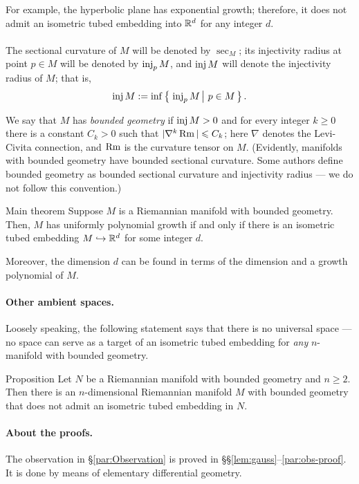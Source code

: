 \documentclass[a4paper,10pt]{article}
\begin{document}
For example,
the hyperbolic plane has exponential growth;
therefore, it does not admit an isometric tubed embedding into $\mathbb{R}^d$ for any integer $d$.




\paragraph{}\label{par:main} 
The sectional curvature of $M$ will be denoted by $\sec_M$;
its injectivity radius at point $p\in M$ will be denoted by $\operatorname{\rm inj}_pM$, and $\operatorname{\rm inj} M$ will denote the injectivity radius of $M$; that is, 
\[\inj M\df \inf\set{\inj_pM}{p\in M}.\]

We say that $M$ has \emph{bounded geometry} if $\operatorname{\rm inj} M>0$ and for every integer $k\ge 0$ there is a constant $C_k > 0$ such that $|\nabla^k \operatorname{\rm Rm}| \leqslant C_k$;
here $\nabla$ denotes the Levi-Civita connection, and $\operatorname{\rm Rm}$ is the curvature tensor on $M$.
(Evidently, manifolds with bounded geometry have bounded sectional curvature.
Some authors define bounded geometry as bounded sectional curvature and injectivity radius --- we do not follow this convention.)

\begin{thm}{Main theorem}
Suppose $M$ is a Riemannian manifold with bounded geometry.
Then, $M$ has uniformly  polynomial growth
if and only if there is an isometric tubed embedding $M \hookrightarrow \mathbb{R}^d$ for some integer $d$.

Moreover, the dimension $d$ can be found in terms of the dimension and a growth polynomial of $M$.
\end{thm}

\paragraph{Other ambient spaces.}\label{par:other-intro}
Loosely speaking, the following statement says that there is no universal space --- no space can serve as a target of an isometric tubed embedding for \textit{any} $n$-manifold with bounded geometry.

\begin{thm}{Proposition}
Let $N$ be a Riemannian manifold with bounded geometry and $n\ge 2$.
Then there is an $n$-dimensional  Riemannian manifold $M$ with bounded geometry that does not admit an isometric tubed embedding in $N$.
\end{thm}

\paragraph{About the proofs.}
The observation in §\ref{par:Observation} is proved in §§\ref{lem:gauss}--\ref{par:obs-proof}.
It is done by means of elementary differential geometry.
\end{document}
